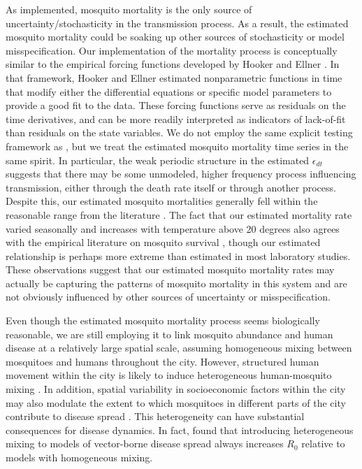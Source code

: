 \documentclass[10pt,letterpaper]{article}
\begin{document}
As implemented, mosquito mortality is the only source of uncertainty/stochasticity in the transmission process.
As a result, the estimated mosquito mortality could be soaking up other sources of stochasticity or model misspecification.
Our implementation of the mortality process is conceptually similar to the empirical forcing functions developed by Hooker and Ellner \cite{Hooker2015}.
In that framework, Hooker and Ellner \cite{Hooker2015} estimated nonparametric functions in time that modify either the differential equations or specific model parameters to provide a good fit to the data.
These forcing functions serve as residuals on the time derivatives, and can be more readily interpreted as indicators of lack-of-fit than residuals on the state variables.
We do not employ the same explicit testing framework as \cite{Hooker2015}, but we treat the estimated mosquito mortality time series in the same spirit.
In particular, the weak periodic structure in the estimated $\epsilon_{dt}$ suggests that there may be some unmodeled, higher frequency process influencing transmission, either through the death rate itself or through another process.
Despite this, our estimated mosquito mortalities generally fell within the reasonable range from the literature \cite{Maciel-de-Freitas2008, Brady2013}.
The fact that our estimated mortality rate varied seasonally and increases with temperature above 20 degrees also agrees with the empirical literature on mosquito survival \cite{Yang2009}, though our estimated relationship is perhaps more extreme than estimated in most laboratory studies.
These observations suggest that our estimated mosquito mortality rates may actually be capturing the patterns of mosquito mortality in this system and are not obviously influenced by other sources of uncertainty or misspecification.

Even though the estimated mosquito mortality process seems biologically reasonable, we are still employing it to link mosquito abundance and human disease at a relatively large spatial scale, assuming homogeneous mixing between mosquitoes and humans throughout the city.
However, structured human movement within the city is likely to induce heterogeneous human-mosquito mixing \cite{Adams2009, Cosner2009a, Stoddard2009}.
In addition, spatial variability in socioeconomic factors within the city may also modulate the extent to which mosquitoes in different parts of the city contribute to disease spread \cite{Mondini2008, Honorio2009, Hu2012, DeMattosAlmeida2007}.
This heterogeneity can have substantial consequences for disease dynamics.
In fact, \cite{Dye1986, Hasibeder1988} found that introducing heterogeneous mixing to models of vector-borne disease spread always increases $R_0$ relative to models with homogeneous mixing.
\end{document}
